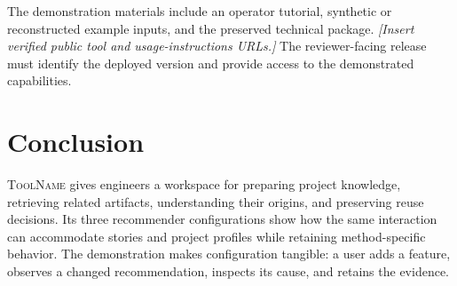 \documentclass[10pt,conference]{IEEEtran}
\newcommand{\toolname}{\textsc{ToolName}}
\newcommand{\draftnote}[1]{\textit{[#1]}}
\begin{document}
The demonstration materials include an operator tutorial, synthetic or reconstructed example inputs, and the preserved technical package. \draftnote{Insert verified public tool and usage-instructions URLs.} The reviewer-facing release must identify the deployed version and provide access to the demonstrated capabilities.

\section{Conclusion}
\toolname{} gives engineers a workspace for preparing project knowledge, retrieving related artifacts, understanding their origins, and preserving reuse decisions. Its three recommender configurations show how the same interaction can accommodate stories and project profiles while retaining method-specific behavior. The demonstration makes configuration tangible: a user adds a feature, observes a changed recommendation, inspects its cause, and retains the evidence.



\end{document}

